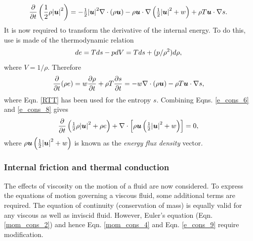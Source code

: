 \begin{equation}\label{e_cons_6}
 \frac{\partial}{\partial{t}}\left(\frac{1}{2}\rho{|{\mbox{\boldmath$u$}}|}^{2}\right)=-{\textstyle \frac{1}{2}}{|{\mbox{\boldmath$u$}}|}^{2}\nabla\cdot(\rho{\mbox{\boldmath$u$}})
                                                                 -\rho{\mbox{\boldmath$u$}}\cdot\nabla\left({\textstyle \frac{1}{2}}{|{\mbox{\boldmath$u$}}|}^{2}+w\right)
                                                                 +\rho{T}{\mbox{\boldmath$u$}}\cdot\nabla{s}.
\end{equation}
It is now required to transform the derivative of the internal energy. To do this, use is made of the thermodynamic relation
\begin{equation}\label{e_cons_7}
 de=Tds-pdV=Tds+(p/\rho^{2})d\rho,
\end{equation}
where $V=1/\rho$. Therefore 
\begin{equation}\label{e_cons_8}
 \frac{\partial}{\partial{t}}(\rho e)=w\frac{\partial\rho}{\partial{t}}+\rho{T}\frac{\partial{s}}{\partial{t}}
                                            =-w\nabla\cdot(\rho{\mbox{\boldmath$u$}})-\rho{T}{\mbox{\boldmath$u$}}\cdot\nabla{s},
\end{equation}
where Eqn. \ref{RTT} has been used for the entropy $s$. Combining Eqns. \ref{e_cons_6} and \ref{e_cons_8} gives
\begin{equation}\label{e_cons_9}
 \frac{\partial}{\partial{t}}\left({\textstyle \frac{1}{2}}\rho{|{\mbox{\boldmath$u$}}|}^{2}+\rho e\right)+\nabla\cdot\left[\rho{\mbox{\boldmath$u$}}\left({\textstyle \frac{1}{2}}{|{\mbox{\boldmath$u$}}|}^{2}+w\right)\right]=0,
\end{equation}
where $\rho{\mbox{\boldmath$u$}}\left({\textstyle \frac{1}{2}}{|{\mbox{\boldmath$u$}}|}^{2}+w\right)$ is known as the \textit{energy flux density} vector.

\subsubsection{Internal friction and thermal conduction}\label{Sect:stressed}
The effects of viscosity on the motion of a fluid are now considered. To express the equations of motion governing a viscous fluid, some additional terms are required. The equation of continuity (conservation of mass) is equally valid for any viscous as well as inviscid fluid. However, Euler's equation (Eqn. \ref{mom_cons_2}) and hence Eqn. \ref{mom_cons_4} and Eqn. \ref{e_cons_9} require modification.

